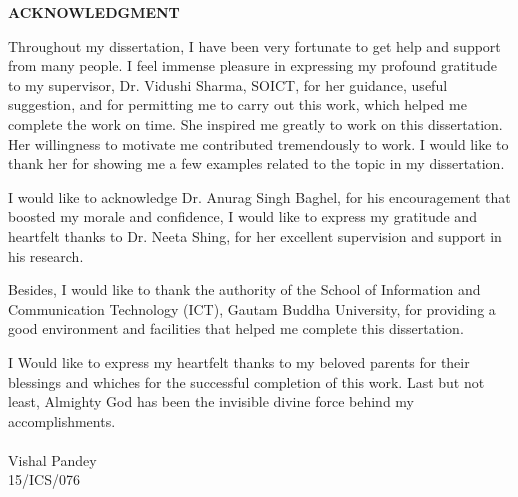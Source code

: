\begin{center}
	\Large
	\textbf{ACKNOWLEDGMENT}
\end{center}
Throughout my dissertation, I have been very fortunate to get help and support from many people. I feel immense pleasure in expressing my profound gratitude to my supervisor, Dr. Vidushi Sharma, SOICT, for her guidance, useful suggestion, and for permitting me to carry out this work, which helped me complete the work on time. She inspired me greatly to work on this dissertation. Her willingness to motivate me contributed tremendously to work. I would like to thank her for showing me a few examples related to the topic in my dissertation.

I would like to acknowledge Dr. Anurag Singh Baghel, for his encouragement that boosted my morale and confidence, I would like to express my gratitude and heartfelt thanks to Dr. Neeta Shing, for her excellent supervision and support in his research.

Besides, I  would like to thank the authority of the School of Information and Communication Technology (ICT), Gautam Buddha University, for providing a good environment and facilities that helped me complete this dissertation.

I Would like to express my heartfelt thanks to my beloved parents for their blessings and whiches for the successful completion of this work. Last but not least, Almighty God has been the invisible divine force behind my accomplishments.
\\
\\
Vishal Pandey
\\
15/ICS/076\\